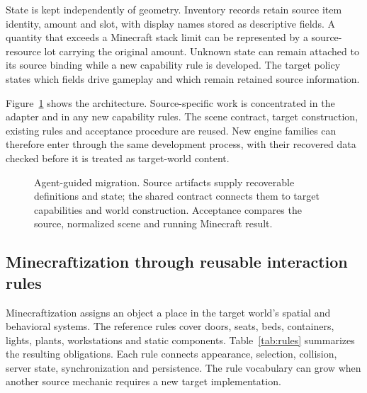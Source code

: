 \documentclass[11pt]{article}
\begin{document}
State is kept independently of geometry. Inventory records retain source item
identity, amount and slot, with display names stored as descriptive fields. A quantity that exceeds a Minecraft stack limit can be represented by a
source-resource lot carrying the original amount. Unknown state can remain
attached to its source binding while a new capability rule is developed. The
target policy states which fields drive gameplay and which remain retained
source information.

Figure~\ref{fig:pipeline} shows the architecture. Source-specific work is concentrated
in the adapter and in any new capability rules. The scene contract, target
construction, existing rules and acceptance procedure are reused. New engine
families can therefore enter through the same development process, with their
recovered data checked before it is treated as target-world content.

\begin{figure}[t]
\centering

\caption{Agent-guided migration. Source artifacts supply recoverable definitions
and state; the shared contract connects them to target capabilities and world
construction. Acceptance compares the source, normalized scene and running
Minecraft result.}
\label{fig:pipeline}
\end{figure}

\subsection{Minecraftization through reusable interaction rules}

Minecraftization assigns an object a place in the target world's spatial and
behavioral systems. The reference rules cover doors, seats, beds, containers,
lights, plants, workstations and static components. Table~\ref{tab:rules} summarizes
the resulting obligations. Each rule connects appearance, selection, collision,
server state, synchronization and persistence. The rule vocabulary can grow
when another source mechanic requires a new target implementation.
\end{document}
